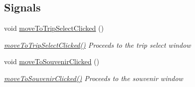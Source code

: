 \subsection*{Signals}
\begin{DoxyCompactItemize}
\item 
void \mbox{\hyperlink{class_trip_window_a022620b15ec96f33d4c5fe5c4463b311}{move\+To\+Trip\+Select\+Clicked}} ()
\begin{DoxyCompactList}\small\item\em \mbox{\hyperlink{class_trip_window_a022620b15ec96f33d4c5fe5c4463b311}{move\+To\+Trip\+Select\+Clicked()}} Proceeds to the trip select window \end{DoxyCompactList}\item 
void \mbox{\hyperlink{class_trip_window_a258950562707b2b3f37b86542a7e70cb}{move\+To\+Souvenir\+Clicked}} ()
\begin{DoxyCompactList}\small\item\em \mbox{\hyperlink{class_trip_window_a258950562707b2b3f37b86542a7e70cb}{move\+To\+Souvenir\+Clicked()}} Proceeds to the souvenir window \end{DoxyCompactList}\end{DoxyCompactItemize}
